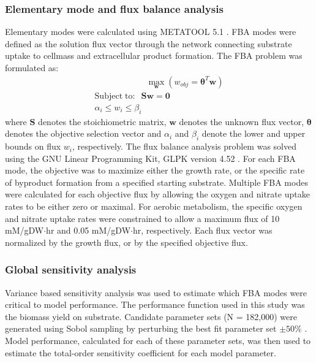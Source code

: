 \documentclass[10pt,twocolumn,twoside,final]{IEEEtran}
\begin{document}
\noindent\subsubsection*{Elementary mode and flux balance analysis}
Elementary modes were calculated using METATOOL 5.1 \cite{2006_vonKamp_Metatool}.
FBA modes were defined as the solution flux vector through the network connecting substrate uptake to cellmass and extracellular product formation.
The FBA problem was formulated as:
\begin{equation}
 \begin{multlined}
	\qquad \qquad \qquad \max_{\boldsymbol{w}}{} \! \left( w_{obj} = \mathbf{\theta}^T \boldsymbol{w} \right) \\
	\mathrm{Subject \; to:}
	 \; \; \mathbf{S}\mathbf{w}=\mathbf{0} \\
\alpha_i \leq w_i \leq \beta_i  \qquad
 \end{multlined}
\end{equation}
where $\mathbf{S}$ denotes the stoichiometric matrix, $\mathbf{w}$ denotes the unknown flux vector, $\boldsymbol{\theta}$ denotes the objective selection vector
and $\alpha_i$ and $\beta_i$ denote the lower and upper bounds on flux $w_{i}$, respectively.
The flux balance analysis problem was solved using the GNU Linear Programming Kit, GLPK version 4.52 \cite{GLPK}.
For each FBA mode, the objective was to maximize either the growth rate, or the specific rate of byproduct formation from a specified starting substrate.
Multiple FBA modes were calculated for each objective flux by allowing the oxygen and nitrate uptake rates to be either zero or maximal.
For aerobic metabolism, the specific oxygen and nitrate uptake rates were constrained to allow a maximum flux of 10 mM/gDW$\cdot$hr and 0.05 mM/gDW$\cdot$hr, respectively.
Each flux vector was normalized by the growth flux, or by the specified objective flux.

\subsubsection*{Global sensitivity analysis}
Variance based sensitivity analysis was used to estimate which FBA modes were critical to model performance.
The performance function used in this study was the biomass yield on substrate.
Candidate parameter sets (N = 182,000) were generated using Sobol sampling by perturbing the best fit parameter set $\pm50\%$ \cite{SALib}.
Model performance, calculated for each of these parameter sets, was then used to estimate the total-order sensitivity coefficient for each model parameter.
\end{document}
